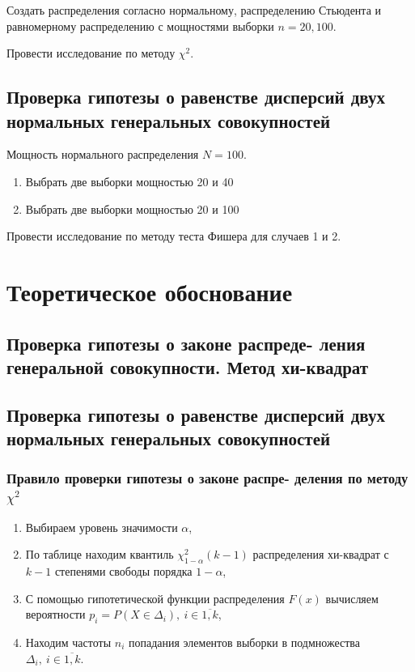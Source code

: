 \documentclass[12pt,a4paper]{article}
\begin{document}
	Создать распределения согласно нормальному, распределению Стьюдента и
	равномерному распределению с мощностями выборки \( n=20, 100 \).

	Провести исследование по методу \( \chi^2 \).

	\subsection{Проверка гипотезы о равенстве дисперсий двух нормальных
		генеральных совокупностей}

		Мощность нормального распределения \( N = 100 \).

		\begin{enumerate}
			\item Выбрать две выборки мощностью 20 и 40
			\item Выбрать две выборки мощностью 20 и 100
		\end{enumerate}

		Провести исследование по методу теста Фишера для случаев 1 и 2.

		\section{Теоретическое обоснование}

		\subsection{Проверка гипотезы о законе распреде- ления генеральной
			совокупности. Метод хи-квадрат}

		\subsection{Проверка гипотезы о равенстве дисперсий двух нормальных
			генеральных совокупностей}

		\subsubsection{Правило проверки гипотезы о законе распре- деления по
			методу \( \chi^2 \)}

		\begin{enumerate}
			\item Выбираем уровень значимости \( \alpha \),
			\item По таблице находим квантиль \( \chi_{1-\alpha}^2 (k - 1) \)
				распределения хи-квадрат с \( k - 1 \) степенями свободы порядка
				\( 1 - \alpha \),
			\item С помощью гипотетической функции распределения \( F(x) \)
				вычисляем вероятности
				\( p_i = P(X \in \Delta_i), \ i \in \overline{1,k} \),
			\item Находим частоты \( n_i \) попадания элементов выборки в
				подмножества \( \Delta_i, \ i \in \overline{1,k} \).
		\end{enumerate}
\end{document}
